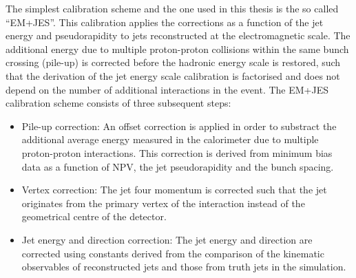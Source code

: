 The simplest calibration scheme and the one used in this thesis is the so called ``EM+JES''. This calibration applies the corrections as a function of the jet energy and pseudorapidity to jets reconstructed at the electromagnetic scale.  The additional energy due to multiple proton-proton collisions within the same bunch crossing (pile-up) is corrected before the hadronic energy scale is restored, such that the derivation of the jet energy scale calibration is factorised and does not depend on the number of additional interactions in the event. The EM+JES calibration scheme consists of three subsequent steps:

\begin{itemize}
\item
Pile-up correction: An offset correction is applied in order to substract the additional average energy measured in the calorimeter due to multiple proton-proton interactions. This correction is derived from minimum bias data as a function of NPV, the jet pseudorapidity and the bunch spacing.
\item
Vertex correction: The jet four momentum is corrected such that the jet originates from the primary vertex of the interaction instead of the geometrical centre of the detector. 
\item
Jet energy and direction correction: The jet energy and direction are corrected using constants derived from the comparison of the kinematic observables of reconstructed jets and those from truth jets in the simulation.
\end{itemize}

